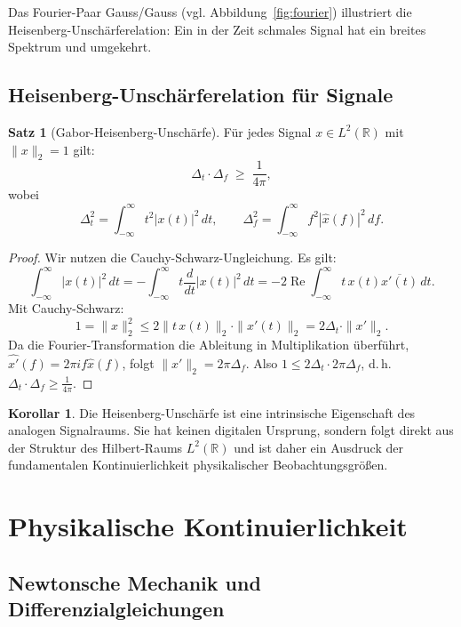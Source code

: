 ﻿\documentclass[a4paper,12pt]{article}
\theoremstyle{definition}
\newtheorem{satz}{Satz}
\newtheorem{korollar}{Korollar}
\begin{document}
Das Fourier-Paar Gauss/Gauss (vgl. Abbildung~\ref{fig:fourier}) illustriert
die Heisenberg-Unschärferelation: Ein in der Zeit schmales Signal hat ein breites
Spektrum und umgekehrt.

\subsection{Heisenberg-Unschärferelation für Signale}

\begin{satz}[Gabor-Heisenberg-Unschärfe]
\label{satz:unschaerfe}
Für jedes Signal $x \in L^2(\mathbb{R})$ mit $\|x\|_2 = 1$ gilt:
\[
\Delta_t \cdot \Delta_f \;\geq\; \frac{1}{4\pi},
\]
wobei
\[
\Delta_t^2 = \int_{-\infty}^{\infty} t^2 |x(t)|^2 \, dt, \qquad
\Delta_f^2 = \int_{-\infty}^{\infty} f^2 |\hat{x}(f)|^2 \, df.
\]
\end{satz}

\begin{proof}
Wir nutzen die Cauchy-Schwarz-Ungleichung.  Es gilt:
\[
\int_{-\infty}^\infty |x(t)|^2 \, dt
= -\int_{-\infty}^\infty t \frac{d}{dt}|x(t)|^2 \, dt
= -2 \operatorname{Re} \int_{-\infty}^\infty t \, x(t) \overline{x'(t)} \, dt.
\]
Mit Cauchy-Schwarz:
\[
1 = \|x\|_2^2 \leq 2\|t\, x(t)\|_2 \cdot \|x'(t)\|_2
= 2\Delta_t \cdot \|x'\|_2.
\]
Da die Fourier-Transformation die Ableitung in Multiplikation überführt,
$\widehat{x'}(f) = 2\pi i f \hat{x}(f)$, folgt $\|x'\|_2 = 2\pi \Delta_f$.
Also $1 \leq 2\Delta_t \cdot 2\pi\Delta_f$, d.\,h.
$\Delta_t \cdot \Delta_f \geq \frac{1}{4\pi}$.
\end{proof}

\begin{korollar}
Die Heisenberg-Unschärfe ist eine intrinsische Eigenschaft des analogen Signalraums.
Sie hat keinen digitalen Ursprung, sondern folgt direkt aus der Struktur des Hilbert-Raums
$L^2(\mathbb{R})$ und ist daher ein Ausdruck der fundamentalen Kontinuierlichkeit
physikalischer Beobachtungsgrößen.
\end{korollar}

\section{Physikalische Kontinuierlichkeit}
\label{sec:physik}

\subsection{Newtonsche Mechanik und Differenzialgleichungen}
\end{document}
